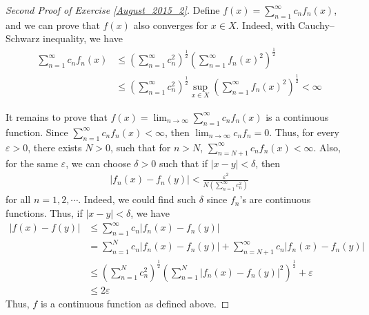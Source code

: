 \documentclass[11pt]{article}
\theoremstyle{definition}
\numberwithin{equation}{subsection}
\begin{document}
\begin{proof}[Second Proof of Exercise \ref{August_2015_2}]
Define $\displaystyle f(x) = \sum_{n=1}^\infty c_n f_n(x)$, and we can prove that $f(x)$ also converges for $x\in X$. Indeed, with Cauchy–Schwarz inequality, we have
\begin{align*}
    \sum_{n=1}^\infty c_nf_n(x) & \leq \left(\sum_{n=1}^\infty c_n^2\right)^{\frac{1}{2}} \left(\sum_{n=1}^\infty f_n(x)^2\right)^{\frac{1}{2}} \\
    & \leq \left(\sum_{n=1}^\infty c_n^2\right)^{\frac{1}{2}} \sup_{x\in X} \left(\sum_{n=1}^\infty f_n(x)^2\right)^{\frac{1}{2}} < \infty
\end{align*}

It remains to prove that $\displaystyle f(x) = \lim_{n\to\infty}\sum_{n=1}^\infty c_n f_n(x)$ is a continuous function. Since $\displaystyle \sum_{n=1}^\infty c_nf_n(x) < \infty$, then $\displaystyle \lim_{n\to\infty} c_n f_n = 0$. Thus, for every $\varepsilon > 0$, there exists $N > 0$, such that for $n > N$, $\displaystyle \sum_{n=N+1}^\infty c_nf_n(x) < \infty$. Also, for the same $\varepsilon$, we can choose $\delta > 0$ such that if $|x - y| < \delta$, then 
\begin{align*}
    \left|f_n(x) - f_n(y)\right| < \frac{\varepsilon^2}{N \left(\sum_{n=1}^\infty c_n^2\right)}
\end{align*}
for all $n = 1,2,\cdots$. Indeed, we could find such $\delta$ since $f_n$'s are continuous functions. Thus, if $|x - y| < \delta$, we have 
\begin{align*}
    \left|f(x) - f(y)\right| & \leq \sum_{n=1}^\infty c_n \left|f_n(x) - f_n(y)\right|\\
    & = \sum_{n=1}^N c_n \left|f_n(x) - f_n(y)\right| + \sum_{n=N+1}^\infty c_n \left|f_n(x) - f_n(y)\right|\\
    & \leq \left(\sum_{n=1}^N c_n^2\right)^{\frac{1}{2}} \left(\sum_{n=1}^N \left|f_n(x) - f_n(y)\right|^2\right)^{\frac{1}{2}} + \varepsilon \\
    & \leq 2 \varepsilon 
\end{align*}
Thus, $f$ is a continuous function as defined above.
\end{proof}
\end{document}
